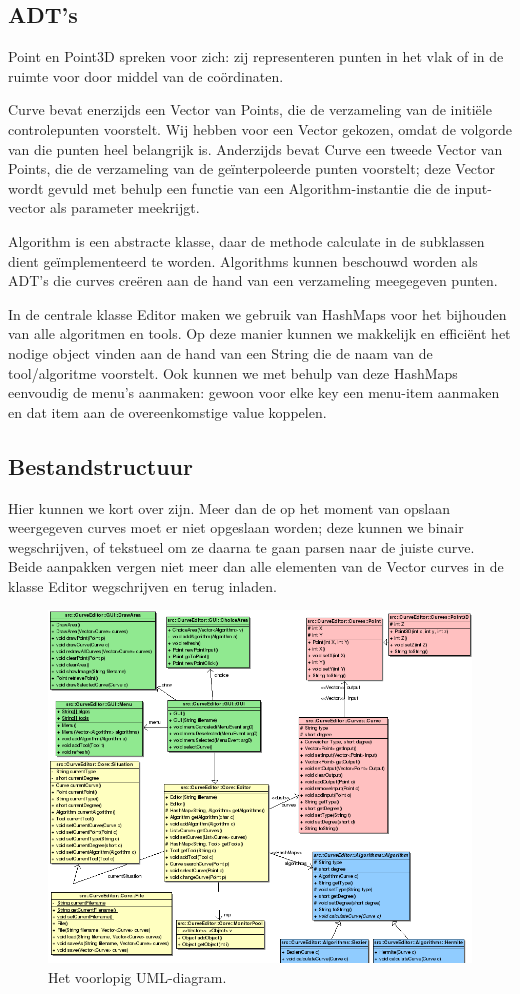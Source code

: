 \documentclass[a4paper,11pt,oneside, titlepage]{article}
\begin{document}
\subsection{ADT's}
Point en Point3D spreken voor zich: zij representeren punten in het vlak of in de ruimte voor door middel van de co\"ordinaten.

Curve bevat enerzijds een Vector van Points, die de verzameling van de initi\"ele controlepunten voorstelt. Wij hebben voor een Vector gekozen, omdat de volgorde van die punten heel belangrijk is. Anderzijds bevat Curve een tweede Vector van Points, die de verzameling van de ge\"interpoleerde punten voorstelt; deze Vector wordt gevuld met behulp een functie van een Algorithm-instantie die de input-vector als parameter meekrijgt.

Algorithm is een abstracte klasse, daar de methode calculate in de subklassen dient ge\"implementeerd te worden. Algorithms kunnen beschouwd worden als ADT's die curves cre\"eren aan de hand van een verzameling meegegeven punten.

In de centrale klasse Editor maken we gebruik van HashMaps voor het bijhouden van alle algoritmen en tools. Op deze manier kunnen we makkelijk en effici\"ent het nodige object vinden aan de hand van een String die de naam van de tool/algoritme voorstelt. Ook kunnen we met behulp van deze HashMaps eenvoudig de menu's aanmaken: gewoon voor elke key een menu-item aanmaken en dat item aan de overeenkomstige value koppelen.

\subsection{Bestandstructuur}
Hier kunnen we kort over zijn. Meer dan de op het moment van opslaan weergegeven curves moet er niet opgeslaan worden; deze kunnen we binair wegschrijven, of tekstueel om ze daarna te gaan parsen naar de juiste curve. Beide aanpakken vergen niet meer dan alle elementen van de Vector curves in de klasse Editor wegschrijven en terug inladen.


\begin{figure}[hbp]
\center
\includegraphics[scale=0.65]{uml.png}
\caption{Het voorlopig UML-diagram.}
\end{figure}
\clearpage
\end{document}
